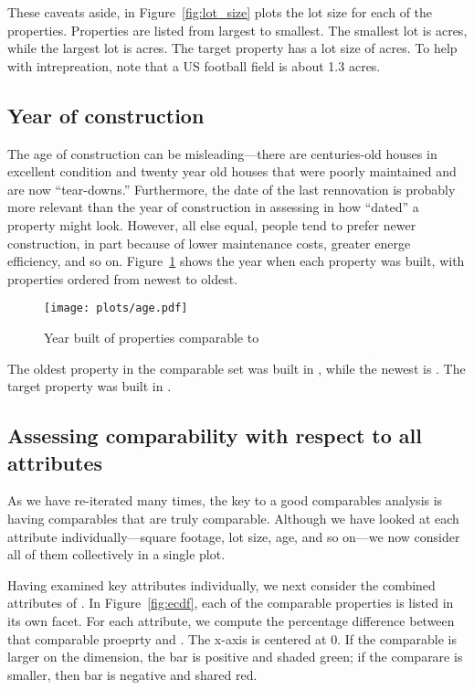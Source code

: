 \documentclass[
12pt, %
letterpaper, %
oneside, %
headinclude,footinclude, %
BCOR5mm, %
]{scrartcl}
\begin{document}
These caveats aside, in Figure~\ref{fig:lot_size} plots the lot size for each of the properties. 
Properties are listed from largest to smallest.
The smallest lot is \SmallestLot{} acres, while the largest lot is \LargestLot{} acres.
The target property has a lot size of \PropertyLotSize{} acres.
To help with intrepreation, note that a US football field is about 1.3 acres.
\ExtremeWarningLargestLot{}
\ExtremeWarningSmallestLot{}

\subsection{Year of construction}
The age of construction can be misleading---there are centuries-old houses in excellent condition and twenty year old houses that were poorly maintained and are now ``tear-downs.''
Furthermore, the date of the last rennovation is probably more relevant than the year of construction in assessing in how ``dated'' a property might look. 
However, all else equal, people tend to prefer newer construction, in part because of lower maintenance costs, greater energe efficiency, and so on. 
Figure~\ref{fig:age} shows the year when each property was built, with properties ordered from newest to oldest. 

\begin{figure}
\centering
\caption{Year built of properties comparable to \PropertyName{}} \label{fig:age}  
\texttt{[image: plots/age.pdf]} 
\end{figure}

The oldest property in the comparable set was built in \Oldest{}, while the newest is \Youngest{}.
The target property was built in \PropertyYearBuilt{}. 
\ExtremeWarningAgeYoung{}
\ExtremeWarningAgeOld{}

\subsection{Assessing comparability with respect to all attributes}
As we have re-iterated many times, the key to a good comparables analysis is having comparables that are truly comparable.
Although we have looked at each attribute individually---square footage, lot size, age, and so on---we now consider all of them collectively in a single plot.

Having examined key attributes individually, we next consider the combined attributes of \PropertyName{}.
In Figure~\ref{fig:ecdf}, each of the comparable properties is listed in its own facet.
For each attribute, we compute the percentage difference between that comparable proeprty and \PropertyName{}.
The x-axis is centered at 0.  
If the comparable is larger on the dimension, the bar is positive and shaded green;
if the comparare is smaller, then bar is negative and shared red. 
\end{document}
